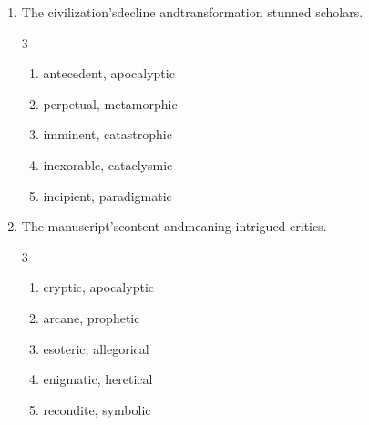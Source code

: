 \documentclass[12pt]{article}
\begin{document}
\begin{enumerate}[label=\textbf{\arabic*.}]
\begin{multicols}{3}
\begin{enumerate}[label=(\Alph*)]
\end{enumerate}

\end{multicols}

\item The civilization's\underline{\hspace{2cm}}decline and\underline{\hspace{2cm}}transformation stunned scholars.

\begin{multicols}{3}

\begin{enumerate}[label=(\Alph*)]

\item antecedent, apocalyptic

\item perpetual, metamorphic

\item imminent, catastrophic

\item inexorable, cataclysmic

\item incipient, paradigmatic

\end{enumerate}

\end{multicols}

\item The manuscript's\underline{\hspace{2cm}}content and\underline{\hspace{2cm}}meaning intrigued critics.

\begin{multicols}{3}

\begin{enumerate}[label=(\Alph*)]

\item cryptic, apocalyptic

\item arcane, prophetic

\item esoteric, allegorical

\item enigmatic, heretical

\item recondite, symbolic

\end{enumerate}

\end{multicols}


\end{enumerate}
\end{document}

